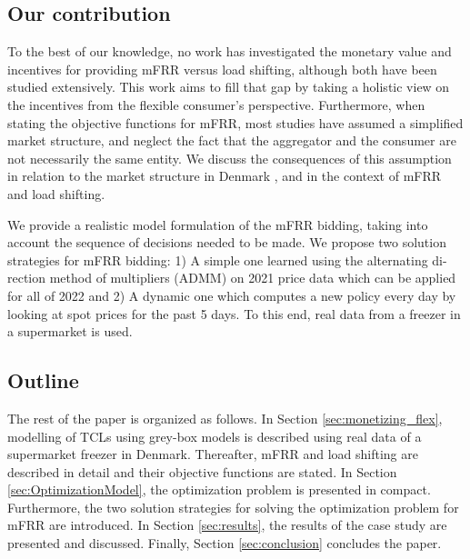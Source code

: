 \subsection{Our contribution}

To the best of our knowledge, no work has investigated the monetary value and incentives for providing mFRR versus load shifting, although both have been studied extensively. This work aims to fill that gap by taking a holistic view on the incentives from the flexible consumer's perspective. Furthermore, when stating the objective functions for mFRR, most studies have assumed a simplified market structure, and neglect the fact that the aggregator and the consumer are not necessarily the same entity. We discuss the consequences of this assumption in relation to the market structure in Denmark \cite{gade2022ecosystem}, and in the context of mFRR and load shifting.

We provide a realistic model formulation of the mFRR bidding, taking into account the sequence of decisions needed to be made. We propose two solution strategies for mFRR bidding: 1) A simple one learned using the alternating di- rection method of multipliers (ADMM) on 2021 price data which can be applied for all of 2022 and 2) A dynamic one which computes a new policy every day by looking at spot prices for the past 5 days. To this end, real data from a freezer in a supermarket is used.

\subsection{Outline}

The rest of the paper is organized as follows. In Section \ref{sec:monetizing_flex}, modelling of TCLs using grey-box models is described using real data of a supermarket freezer in Denmark. Thereafter, mFRR and load shifting are described in detail and their objective functions are stated. In Section \ref{sec:OptimizationModel}, the optimization problem is presented in compact. Furthermore, the two solution strategies for solving the optimization problem for mFRR are introduced. In Section \ref{sec:results}, the results of the case study are presented and discussed. Finally, Section \ref{sec:conclusion} concludes the paper.
